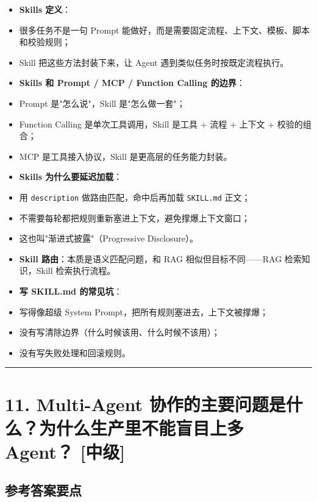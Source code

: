 \documentclass[9pt,a4paper,twocolumn]{ctexart}
\newcommand{\lvzhong}{\usebox{\badgezhongbox}}
\def\lvzhong{[中级]}%
\begin{document}
\begin{itemize}[itemsep=1pt, topsep=2pt]
  \item \textbf{Skills 定义}：
  \item 很多任务不是一句 Prompt 能做好，而是需要固定流程、上下文、模板、脚本和校验规则；
  \item Skill 把这些方法封装下来，让 Agent 遇到类似任务时按既定流程执行。
  \item \textbf{Skills 和 Prompt / MCP / Function Calling 的边界}：
  \item Prompt 是"怎么说"，Skill 是"怎么做一套"；
  \item Function Calling 是单次工具调用，Skill 是工具 + 流程 + 上下文 + 校验的组合；
  \item MCP 是工具接入协议，Skill 是更高层的任务能力封装。
  \item \textbf{Skills 为什么要延迟加载}：
  \item 用 \texttt{description} 做路由匹配，命中后再加载 \texttt{SKILL.md} 正文；
  \item 不需要每轮都把规则重新塞进上下文，避免撑爆上下文窗口；
  \item 这也叫"渐进式披露"（Progressive Disclosure）。
  \item \textbf{Skill 路由}：本质是语义匹配问题，和 RAG 相似但目标不同——RAG 检索知识，Skill 检索执行流程。
  \item \textbf{写 SKILL.md 的常见坑}：
  \item 写得像超级 System Prompt，把所有规则塞进去，上下文被撑爆；
  \item 没有写清除边界（什么时候该用、什么时候不该用）；
  \item 没有写失败处理和回滚规则。
\end{itemize}


\vspace{2pt}
\noindent\rule{\columnwidth}{0.3pt}\vspace{2pt}



\section*{11. Multi-Agent 协作的主要问题是什么？为什么生产里不能盲目上多 Agent？ \lvzhong{}}


\subsection*{参考答案要点}
\end{document}
